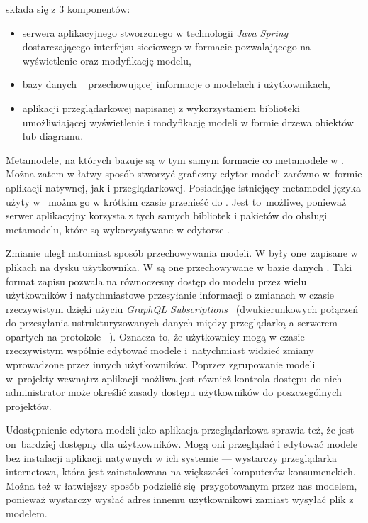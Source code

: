 \SiriusWeb{} składa się z 3 komponentów:

\begin{itemize}
	\item serwera aplikacyjnego stworzonego w technologii \emph{Java
		      Spring}~\cite{java-spring-homepage} dostarczającego interfejsu sieciowego  w formacie \GraphQL{} pozwalającego na wyświetlenie oraz modyfikację modelu,
	\item bazy danych \PostgreSQL{}~\cite{postgresql-homepage} przechowującej informacje o modelach i użytkownikach,
	\item aplikacji przeglądarkowej napisanej z wykorzystaniem biblioteki \React{}~\cite{react-homepage} umożliwiającej wyświetlenie i modyfikację modeli w formie drzewa obiektów lub diagramu.
\end{itemize}

Metamodele, na których bazuje \SiriusWeb{} są w tym samym formacie \Ecore{} co
metamodele w \SiriusDesktop{}. Można zatem w łatwy sposób stworzyć
graficzny edytor modeli zarówno w~formie aplikacji natywnej, jak i
przeglądarkowej. Posiadając istniejący metamodel języka użyty
w~\SiriusDesktop{} można go w krótkim czasie przenieść do \SiriusWeb{}. Jest
to~możliwe, ponieważ serwer aplikacyjny korzysta z tych samych bibliotek i
pakietów do obsługi metamodelu, które są wykorzystywane w edytorze
\SiriusDesktop{}.

Zmianie uległ natomiast sposób przechowywania modeli. W \SiriusDesktop{}
były one~zapisane w plikach na dysku użytkownika. W \SiriusWeb{} są one
przechowywane w bazie danych \PostgreSQL{}. Taki format zapisu pozwala na
równoczesny dostęp do modelu przez wielu użytkowników i natychmiastowe
przesyłanie informacji o zmianach w czasie rzeczywistym dzięki użyciu
\emph{GraphQL Subscriptions}~\cite{graphql-subscriptions} (dwukierunkowych
połączeń do przesyłania ustrukturyzowanych danych między przeglądarką a
serwerem opartych na protokole \WebSocket{}~\cite{wikipedia-websocket}).
Oznacza to, że użytkownicy mogą w czasie rzeczywistym wspólnie edytować modele
i~natychmiast widzieć zmiany wprowadzone przez innych użytkowników.
Poprzez zgrupowanie modeli w~projekty wewnątrz aplikacji \SiriusWeb{}
możliwa jest również kontrola dostępu do nich --- administrator może określić
zasady dostępu użytkowników do poszczególnych projektów.

Udostępnienie edytora modeli jako aplikacja przeglądarkowa sprawia też, że jest
on~bardziej dostępny dla użytkowników. Mogą oni przeglądać i edytować modele
bez instalacji aplikacji natywnych w ich systemie --- wystarczy przeglądarka
internetowa, która jest zainstalowana na większości komputerów konsumenckich.
Można też w łatwiejszy sposób podzielić się~przygotowanym przez nas modelem,
ponieważ wystarczy wysłać adres  innemu użytkownikowi zamiast
wysyłać plik z modelem.

